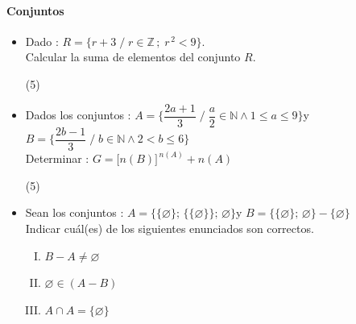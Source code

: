 \documentclass[11pt, twocolumn, landscape, a4paper]{article}
\begin{document}
\paragraph*{Conjuntos}

\begin{itemize}
\item{Dado : \quad$R = \big\{r + 3\;/\; r \in \mathbb{Z}\,;\; r^{\,2} < 9\big\}$. \\ Calcular la suma de elementos del conjunto $R$.
\begin{tasks}(5)
\end{tasks}}

\item{Dados los conjuntos : $A = \Big\{\dfrac{2a + 1}{3}\;/\;\dfrac{a}{2} \in \mathbb{N} \wedge 1 \leq a \leq 9\Big\}$\quad y \\ $B = \Big\{\dfrac{2b - 1}{3}\;/\;b \in \mathbb{N} \wedge 2 < b \leq 6 \Big\}$ \\ Determinar : $G = \big[n(B)\big]^{\,n(A)} + n(A)$
\begin{tasks}(5)
\end{tasks}}
\item{Sean los conjuntos : $A = \big\{\{\varnothing\};\,\{\{\varnothing\}\};\,\varnothing\big\}$\quad y \quad$B = \big\{\{\varnothing\};\,\varnothing\big\} - \{\varnothing\}$ \\ Indicar cuál(es) de los siguientes enunciados son correctos.
\begin{enumerate}[I.]
\item{$B - A \neq \varnothing$}
\item{$\varnothing \in (A - B)$}
\item{$A \cap A = \{\varnothing\}$}
\end{enumerate}

}
\end{itemize}
\end{document}
